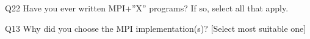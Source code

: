\begin{description}%
\item{Q22} Have you ever written MPI+”X” programs? If so, select all that apply.%
\item{Q13} Why did you choose the MPI implementation(s)? [Select most suitable one]%
\end{description}%
